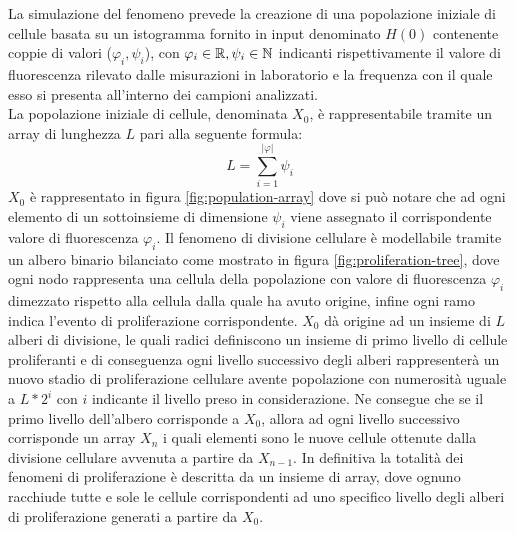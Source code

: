 La simulazione del fenomeno prevede la creazione di una popolazione iniziale
di cellule basata su un istogramma fornito in input denominato $H(0)$
contenente coppie di valori ($\varphi_{i}, \psi_{i}$),
con $\varphi_{i} \in \mathbb{R}, \psi_{i} \in \mathbb{N}$ indicanti rispettivamente il
valore di fluorescenza rilevato dalle misurazioni in laboratorio e
la frequenza con il quale esso si presenta all'interno dei campioni analizzati.
\\
La popolazione iniziale di cellule, denominata $X_{0}$, è rappresentabile
tramite un array di
lunghezza $L$ pari alla seguente formula: 
$$L = \sum_{i=1}^{|\varphi|} \psi_{i}$$
$X_{0}$ è rappresentato in figura \ref{fig:population-array} dove si
può notare che ad ogni elemento
di un sottoinsieme di dimensione $\psi_{i}$ viene assegnato il corrispondente
valore di fluorescenza $\varphi_{i}$.
Il fenomeno di divisione cellulare è modellabile tramite un albero binario 
bilanciato
come mostrato in figura \ref{fig:proliferation-tree}, dove ogni nodo rappresenta
una cellula della popolazione con valore di fluorescenza $\varphi_{i}$
dimezzato rispetto alla cellula dalla quale ha avuto origine, infine ogni
ramo indica l'evento di proliferazione corrispondente.
$X_{0}$ dà origine ad un insieme di $L$ alberi di
divisione, le quali radici definiscono un insieme di primo livello di cellule
proliferanti e di conseguenza ogni livello successivo degli alberi rappresenterà
un nuovo stadio di proliferazione cellulare avente popolazione con numerosità
uguale a $L * 2^{i}$ con $i$ indicante il livello preso in considerazione.
Ne consegue che se il primo livello dell'albero corrisponde a $X_{0}$,
allora ad ogni livello successivo corrisponde un array $X_{n}$ i quali
elementi sono le nuove cellule ottenute dalla divisione cellulare avvenuta a 
partire da $X_{n-1}$.
In definitiva la totalità dei fenomeni di proliferazione è descritta da un
insieme di array, dove ognuno racchiude tutte e sole le cellule
corrispondenti ad uno specifico livello degli alberi di proliferazione generati
a partire da $X_{0}$.
